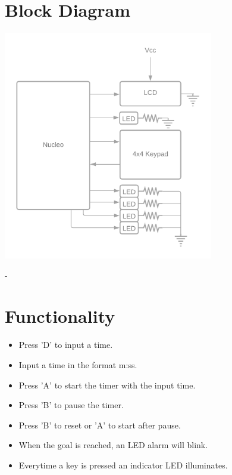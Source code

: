 \documentclass{article}
\begin{document}
\section{Block Diagram}
\begin{center}
    {\includegraphics[height=10cm]{graphics/CSE321_project2_block_diagram.png}\centering} 
\end{center}
-
\newpage

\section{Functionality}
\begin{itemize}
    \item Press 'D' to input a time.
    \item Input a time in the format m:ss.
    \item Press 'A' to start the timer with the input time.
    \item Press 'B' to pause the timer.
    \item Press 'B' to reset or 'A' to start after pause.
    \item When the goal is reached, an LED alarm will blink.
    \item Everytime a key is pressed an indicator LED illuminates.
\end{itemize}
\end{document}
